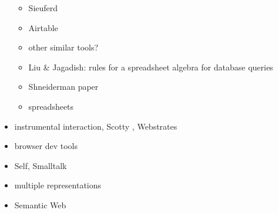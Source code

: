 \documentclass[sigplan,10pt,anonymous,review]{acmart}
\providecommand{\tightlist}{%
  \setlength{\itemsep}{0pt}\setlength{\parskip}{0pt}}
\begin{document}
\begin{itemize}
  \begin{itemize}
  \tightlist
  \item
    Sieuferd \citep{bakke2016}
  \item
    Airtable \citep{2020a}
  \item
    other similar tools?
  \item
    Liu \& Jagadish: rules for a spreadsheet algebra for database
    queries \citep{liu2009}
  \item
    Shneiderman paper
  \item
    spreadsheets
  \end{itemize}
\item
  instrumental interaction, Scotty \citep{eagan2011}, Webstrates
\item
  browser dev tools
\item
  Self, Smalltalk
\item
  multiple representations
\item
  Semantic Web
\end{itemize}



\end{document}
